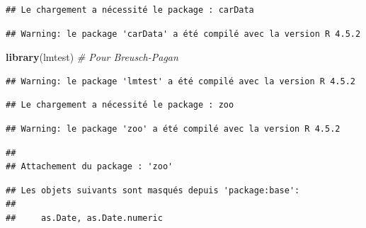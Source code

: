 \documentclass[
]{article}
\newenvironment{Shaded}{\begin{snugshade}}{\end{snugshade}}
\newcommand{\AttributeTok}[1]{\textcolor[rgb]{0.13,0.29,0.53}{#1}}
\newcommand{\CommentTok}[1]{\textcolor[rgb]{0.56,0.35,0.01}{\textit{#1}}}
\newcommand{\FunctionTok}[1]{\textcolor[rgb]{0.13,0.29,0.53}{\textbf{#1}}}
\newcommand{\NormalTok}[1]{#1}
\newcommand{\OtherTok}[1]{\textcolor[rgb]{0.56,0.35,0.01}{#1}}
\newcommand{\SpecialCharTok}[1]{\textcolor[rgb]{0.81,0.36,0.00}{\textbf{#1}}}
\begin{document}
\begin{verbatim}
## Le chargement a nécessité le package : carData
\end{verbatim}

\begin{verbatim}
## Warning: le package 'carData' a été compilé avec la version R 4.5.2
\end{verbatim}

\begin{Shaded}
\begin{Highlighting}[]
\FunctionTok{library}\NormalTok{(lmtest) }\CommentTok{\# Pour Breusch{-}Pagan}
\end{Highlighting}
\end{Shaded}

\begin{verbatim}
## Warning: le package 'lmtest' a été compilé avec la version R 4.5.2
\end{verbatim}

\begin{verbatim}
## Le chargement a nécessité le package : zoo
\end{verbatim}

\begin{verbatim}
## Warning: le package 'zoo' a été compilé avec la version R 4.5.2
\end{verbatim}

\begin{verbatim}
## 
## Attachement du package : 'zoo'
\end{verbatim}

\begin{verbatim}
## Les objets suivants sont masqués depuis 'package:base':
## 
##     as.Date, as.Date.numeric
\end{verbatim}

\begin{Shaded}
\end{Shaded}
\end{document}

